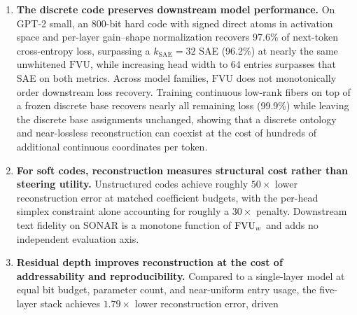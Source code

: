 \begin{enumerate}
averaged across rows, the hard code outperforms all SAEs only under
fixed-length support indexing ($0.158$ vs.\ $0.180$), because its entries
are used nearly uniformly whereas an L1 SAE's latents have skewed firing
rates. On the sentence-split cache, a wider $\topk$ SAE
($k_{\mathrm{SAE}}{=}256$) outperforms the hard stacks under both average
and per-row bit budgets ($0.128$ and $0.129$ vs.\ $0.161$ and $0.164$;
Appendix~\ref{sec:quantrate}). The hard code sits $3.1\times$ above the
Gaussian reference for its rate, and so at least that far from the data's
distortion--rate function, a limit over long blocks of samples that a
code describing each sample alone need not be able to
reach~\cite{cover2006}. Training this discrete stack required matching
the classifier temperature to the logit scale, applying relative logit
noise, rescaling the weight on the batch-mean uniformity term
$\mathrm{KL}_m$, and rescaling dictionary initialization (which alone
reduced held-out error by one third).
\item \textbf{The discrete code preserves downstream model performance.}
On GPT-2 small, an 800-bit hard code with signed direct atoms in
activation space and per-layer gain--shape normalization recovers 97.6\%
of next-token cross-entropy loss, surpassing a $k_{\mathrm{SAE}}{=}32$
SAE (96.2\%) at nearly the same unwhitened $\mathrm{FVU}$, while
increasing head width to 64 entries surpasses that SAE on both metrics.
Across model families, $\mathrm{FVU}$ does not monotonically order
downstream loss recovery. Training continuous low-rank fibers on top of a
frozen discrete base recovers nearly all remaining loss (99.9\%) while
leaving the discrete base assignments unchanged, showing that a discrete
ontology and near-lossless reconstruction can coexist at the cost of
hundreds of additional continuous coordinates per token.
\item \textbf{For soft codes, reconstruction measures structural cost
rather than steering utility.} Unstructured codes achieve roughly
$50\times$ lower reconstruction error at matched coefficient budgets,
with the per-head simplex constraint alone accounting for roughly a
$30\times$ penalty. Downstream text fidelity on SONAR is a monotone
function of $\mathrm{FVU}_w$ and adds no independent evaluation axis.
\item \textbf{Residual depth improves reconstruction at the cost of
addressability and reproducibility.} Compared to a single-layer model at
equal bit budget, parameter count, and near-uniform entry usage, the
five-layer stack achieves $1.79\times$ lower reconstruction error, driven

\end{enumerate}
